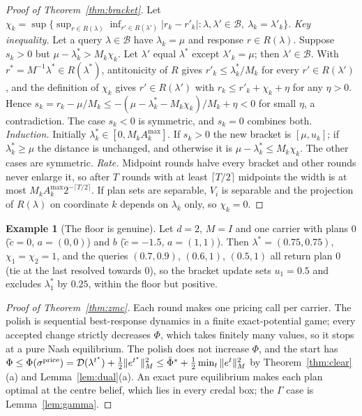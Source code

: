 \documentclass[preprint,12pt]{elsarticle}
\theoremstyle{definition}
\newtheorem{example}[theorem]{Example}
\theoremstyle{remark}
\newcommand{\Amax}{A^{\max}}
\begin{document}
\begin{proof}[Proof of Theorem~\ref{thm:bracket}]
Let $\chi_k=\sup\{\sup_{r\in R(\lambda)}\inf_{r'\in R(\lambda')}|r_k-r'_k|:\lambda,\lambda'\in\mathcal B,\ \lambda_k=\lambda'_k\}$. \emph{Key inequality.} Let a query $\lambda\in\mathcal B$ have $\lambda_k=\mu$ and response $r\in R(\lambda)$. Suppose $s_k>0$ but $\mu-\lambda^*_k>M_k\chi_k$. Let $\lambda'$ equal $\lambda^*$ except $\lambda'_k=\mu$; then $\lambda'\in\mathcal B$. With $r^*=M^{-1}\lambda^*\in R(\lambda^*)$, antitonicity of $R$ gives $r'_k\le\lambda^*_k/M_k$ for every $r'\in R(\lambda')$, and the definition of $\chi_k$ gives $r'\in R(\lambda')$ with $r_k\le r'_k+\chi_k+\eta$ for any $\eta>0$. Hence $s_k=r_k-\mu/M_k\le-(\mu-\lambda^*_k-M_k\chi_k)/M_k+\eta<0$ for small $\eta$, a contradiction. The case $s_k<0$ is symmetric, and $s_k=0$ combines both. \emph{Induction.} Initially $\lambda^*_k\in[0,M_k\Amax_k]$. If $s_k>0$ the new bracket is $[\mu,u_k]$; if $\lambda^*_k\ge\mu$ the distance is unchanged, and otherwise it is $\mu-\lambda^*_k\le M_k\chi_k$. The other cases are symmetric. \emph{Rate.} Midpoint rounds halve every bracket and other rounds never enlarge it, so after $T$ rounds with at least $\lceil T/2\rceil$ midpoints the width is at most $M_k\Amax_k2^{-\lceil T/2\rceil}$. If plan sets are separable, $V_i$ is separable and the projection of $R(\lambda)$ on coordinate $k$ depends on $\lambda_k$ only, so $\chi_k=0$.
\end{proof}

\begin{example}[The floor is genuine]\label{ex:kappa}
Let $d=2$, $M=I$ and one carrier with plans $0$ ($\tilde c=0$, $a=(0,0)$) and $b$ ($\tilde c=-1.5$, $a=(1,1)$). Then $\lambda^*=(0.75,0.75)$, $\chi_1=\chi_2=1$, and the queries $(0.7,0.9)$, $(0.6,1)$, $(0.5,1)$ all return plan $0$ (tie at the last resolved towards $0$), so the bracket update sets $u_1=0.5$ and excludes $\lambda^*_1$ by $0.25$, within the floor but positive.
\end{example}

\begin{proof}[Proof of Theorem~\ref{thm:zmc}]
Each round makes one pricing call per carrier. The polish is sequential best-response dynamics in a finite exact-potential game; every accepted change strictly decreases $\Phi$, which takes finitely many values, so it stops at a pure Nash equilibrium. The polish does not increase $\Phi$, and the start has $\Phi\le\Phi(\sigma^{\rm price})=\mathcal D(\lambda^{t^\star})+\tfrac12\|e^{t^\star}\|_M^2\le\bar\Phi^*+\tfrac12\min_t\|e^t\|_M^2$ by Theorem~\ref{thm:clear}(a) and Lemma~\ref{lem:dual}(a). An exact pure equilibrium makes each plan optimal at the centre belief, which lies in every credal box; the $\Gamma$ case is Lemma~\ref{lem:gamma}.
\end{proof}
\end{document}
